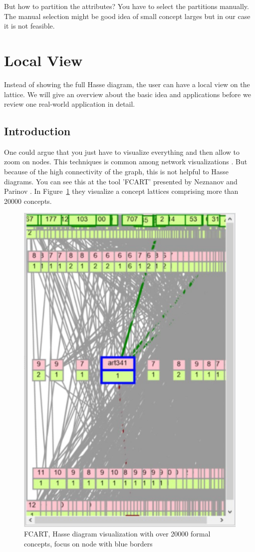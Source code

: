 \documentclass[11pt]{report}
\begin{document}
But how to partition the attributes? You have to select the partitions manually. The manual selection might be good idea of small concept larges but in our case it is not feasible.

\section{Local View}
\label{Local View}

Instead of showing the full Hasse diagram, the user can have a local view on the lattice. We will give an overview about the basic idea and applications before we review one real-world application in detail. \\

\subsection{Introduction}

One could argue that you just have to visualize everything and then allow to zoom on nodes. This techniques is common among network visualizations \cite{Herman2000}. But because of the high connectivity of the graph, this is not helpful to Hasse diagrams. You can see this at the tool 'FCART' presented by Neznanov and Parinov \cite{Neznanov2014}. In Figure~\ref{figure:fcart} they visualize a concept lattices comprising more than 20000 concepts. \\

\begin{figure}[!ht]
	\centering
	\includegraphics[width=0.5\linewidth]{./images/fcart}
\caption{FCART, Hasse diagram visualization with over 20000 formal concepts, focus on node with blue borders \cite{Neznanov2014}}
\label{figure:fcart}
\end{figure}
\end{document}
